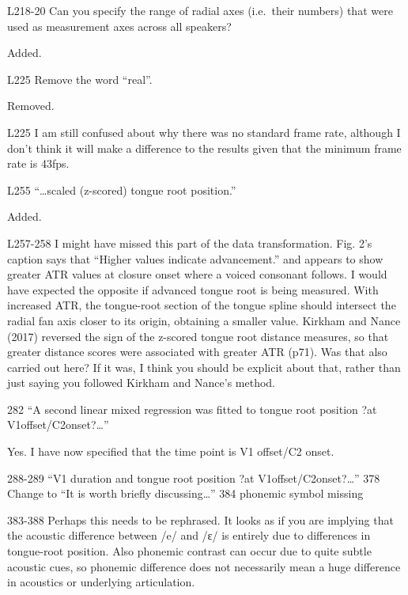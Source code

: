 \documentclass[]{article}
\begin{document}
L218-20 Can you specify the range of radial axes (i.e.~their numbers)
that were used as measurement axes across all speakers?

\color{plum}

Added. \color{black}

L225 Remove the word ``real''.

\color{plum}

Removed. \color{black}

L225 I am still confused about why there was no standard frame rate,
although I don't think it will make a difference to the results given
that the minimum frame rate is 43fps.

L255 ``\ldots{}scaled (z-scored) tongue root position.''

\color{plum}

Added. \color{black}

L257-258 I might have missed this part of the data transformation. Fig.
2's caption says that ``Higher values indicate advancement.'' and
appears to show greater ATR values at closure onset where a voiced
consonant follows. I would have expected the opposite if advanced tongue
root is being measured. With increased ATR, the tongue-root section of
the tongue spline should intersect the radial fan axis closer to its
origin, obtaining a smaller value. Kirkham and Nance (2017) reversed the
sign of the z-scored tongue root distance measures, so that greater
distance scores were associated with greater ATR (p71). Was that also
carried out here? If it was, I think you should be explicit about that,
rather than just saying you followed Kirkham and Nance's method.

282 ``A second linear mixed regression was fitted to tongue root
position ?at V1offset/C2onset?\ldots{}''

\color{plum}

Yes. I have now specified that the time point is V1 offset/C2 onset.
\color{black}

288-289 ``V1 duration and tongue root position ?at
V1offset/C2onset?\ldots{}'' 378 Change to ``It is worth briefly
discussing\ldots{}'' 384 phonemic symbol missing

383-388 Perhaps this needs to be rephrased. It looks as if you are
implying that the acoustic difference between /e/ and /ɛ/ is entirely
due to differences in tongue-root position. Also phonemic contrast can
occur due to quite subtle acoustic cues, so phonemic difference does not
necessarily mean a huge difference in acoustics or underlying
articulation.
\end{document}
